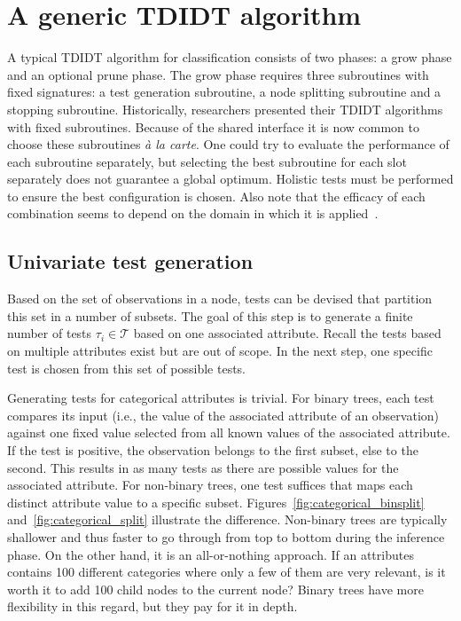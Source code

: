 \section{A generic TDIDT algorithm}
A typical TDIDT algorithm for classification consists of two phases: a grow phase and an optional prune phase. The grow phase requires three subroutines with fixed signatures: a test generation subroutine, a node splitting subroutine and a stopping subroutine. Historically, researchers presented their TDIDT algorithms with fixed subroutines. Because of the shared interface it is now common to choose these subroutines \emph{\`{a} la carte}. One could try to evaluate the performance of each subroutine separately, but selecting the best subroutine for each slot separately does not guarantee a global optimum. Holistic tests must be performed to ensure the best configuration is chosen. Also note that the efficacy of each combination seems to depend on the domain in which it is applied~\cite{mingers1989empirical}.

\subsection{Univariate test generation}
Based on the set of observations in a node, tests can be devised that partition this set in a number of subsets. The goal of this step is to generate a finite number of tests $\tau_i \in \mathcal{T}$ based on one associated attribute. Recall the tests based on multiple attributes exist but are out of scope. In the next step, one specific test is chosen from this set of possible tests.

Generating tests for categorical attributes is trivial. For binary trees, each test compares its input (i.e., the value of the associated attribute of an observation) against one fixed value selected from all known values of the associated attribute. If the test is positive, the observation belongs to the first subset, else to the second. This results in as many tests as there are possible values for the associated attribute. For non-binary trees, one test suffices that maps each distinct attribute value to a specific subset. Figures~\ref{fig:categorical_binsplit} and~\ref{fig:categorical_split} illustrate the difference. Non-binary trees are typically shallower and thus faster to go through from top to bottom during the inference phase. On the other hand, it is an all-or-nothing approach. If an attributes contains 100 different categories where only a few of them are very relevant, is it worth it to add 100 child nodes to the current node? Binary trees have more flexibility in this regard, but they pay for it in depth.

